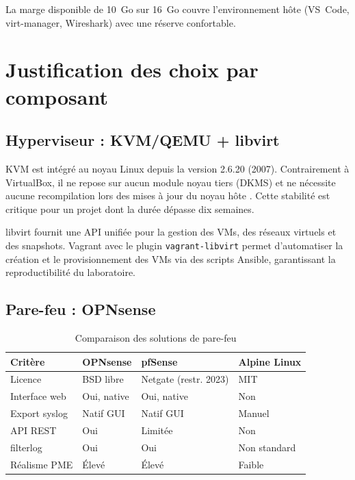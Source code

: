 \documentclass[12pt,a4paper]{article}
\begin{document}
\medskip
La marge disponible de 10~Go sur 16~Go couvre l'environnement hôte
(VS~Code, virt-manager, Wireshark) avec une réserve confortable.

\section{Justification des choix par composant}

\subsection{Hyperviseur : KVM/QEMU + libvirt}

KVM est intégré au noyau Linux depuis la version 2.6.20 (2007).
Contrairement à VirtualBox, il ne repose sur aucun module noyau tiers
(DKMS) et ne nécessite aucune recompilation lors des mises à jour du
noyau hôte \cite{kvm_kernel}. Cette stabilité est critique pour un projet
dont la durée dépasse dix semaines.

libvirt fournit une API unifiée pour la gestion des VMs, des réseaux virtuels
et des snapshots. Vagrant avec le plugin \texttt{vagrant-libvirt} permet
d'automatiser la création et le provisionnement des VMs via des scripts
Ansible, garantissant la reproductibilité du laboratoire.

\subsection{Pare-feu : OPNsense}

\begin{table}[H]
\centering
\caption{Comparaison des solutions de pare-feu}
\label{tab:firewall}
\begin{tabularx}{\textwidth}{|l|X|X|X|}
\hline
\textbf{Critère} & \textbf{OPNsense} & \textbf{pfSense} & \textbf{Alpine Linux} \\
\hline
Licence       & BSD libre & Netgate (restr. 2023) & MIT \\
Interface web & Oui, native & Oui, native & Non \\
Export syslog & Natif GUI & Natif GUI & Manuel \\
API REST      & Oui & Limitée & Non \\
filterlog     & Oui & Oui & Non standard \\
Réalisme PME  & Élevé & Élevé & Faible \\
\hline
\end{tabularx}
\end{table}
\end{document}
